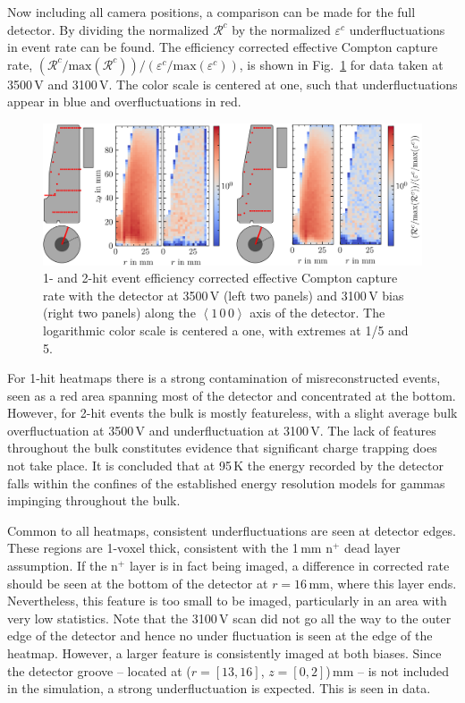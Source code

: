Now including all camera positions, a comparison can be made for the full detector. By dividing the normalized $\mathcal{R}^c$ by the normalized $\varepsilon^c$ underfluctuations in event rate can be found. The efficiency corrected effective Compton capture rate, $(\mathcal{R}^c/\text{max}(\mathcal{R}^c))/(\varepsilon^c/\text{max}(\varepsilon^c))$, is shown in Fig.~\ref{fig:acceptance_corr_rate} for data taken at 3500\,V and 3100\,V. The color scale is centered at one, such that underfluctuations appear in blue and overfluctuations in red.
\begin{figure}[htb]
    \centering
    \includegraphics[width=6in]{figs/trapping/acceptance_corr_rate.png}
    \caption{1- and 2-hit event efficiency corrected effective Compton capture rate with the detector at 3500\,V (left two panels) and 3100\,V bias (right two panels) along the $\left<1\,0\,0\right>$ axis of the detector. The logarithmic color scale is centered a one, with extremes at 1/5 and 5.}
	\label{fig:acceptance_corr_rate}
\end{figure}

For 1-hit heatmaps there is a strong contamination of misreconstructed events, seen as a red area spanning most of the detector and concentrated at the bottom. However, for 2-hit events the bulk is mostly featureless, with a slight average bulk overfluctuation at 3500\,V and underfluctuation at 3100\,V. The lack of features throughout the bulk constitutes evidence that significant charge trapping does not take place. It is concluded that at 95\,K the energy recorded by the detector falls within the confines of the established energy resolution models for gammas impinging throughout the bulk.

Common to all heatmaps, consistent underfluctuations are seen at detector edges. These regions are 1-voxel thick, consistent with the 1\,mm n$^+$ dead layer assumption. If the n$^+$ layer is in fact being imaged, a difference in corrected rate should be seen at the bottom of the detector at $r=16$\,mm, where this layer ends. Nevertheless, this feature is too small to be imaged, particularly in an area with very low statistics. Note that the 3100\,V scan did not go all the way to the outer edge of the detector and hence no under fluctuation is seen at the edge of the heatmap. However, a larger feature is consistently imaged at both biases. Since the detector groove -- located at ($r = [13,16]$, $z = [0,2]$)\,mm -- is not included in the simulation, a strong underfluctuation is expected. This is seen in data. 

